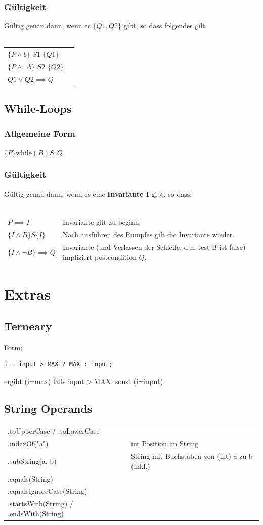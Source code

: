 \documentclass[12pt,a4paper]{article}
\begin{document}
\subsubsection{Gültigkeit}
Gültig genau dann, wenn es $\{Q1, Q2\}$ gibt, so dass folgendes gilt:\\\\
\begin{tabular}{ll}
$\{P \land b\}$ $S1$ $\{Q1\}$\\
$\{P \land \neg b \}$ $S2$ $\{Q2\}$\\
$Q1 \lor Q2 \implies Q$
\end{tabular}

\subsection{While-Loops}
\subsubsection{Allgemeine Form}
$\{P\} \text{while}(B) S; {Q}$
\subsubsection{Gültigkeit}
Gültig genau dann, wenn es eine \textbf{Invariante I} gibt, so dass:\\\\
\begin{tabularx}{\linewidth}{lX}
$P \implies I$ & Invariante gilt zu beginn.\\
$\{I \land B\} S \{I\}$ & Nach ausführen des Rumpfes gilt die Invariante wieder.\\
$\{I \land \neg B\} \implies Q$ & Invariante (und Verlassen der Schleife, d.h. test B ist false) impliziert postcondition $Q$.
\end{tabularx}
\section{Extras}
\subsection{Terneary}
Form:\\
\begin{verbatim}
i = input > MAX ? MAX : input;
\end{verbatim}
ergibt (i=max) falls input$>$MAX, sonst (i=input).
\subsection{String Operands}
\begin{tabularx}{\linewidth}{l X}
.toUpperCase / .toLowerCase\\
.indexOf("a") & int Position im String\\
.subString(a, b) & String mit Buchstaben von (int) a zu b (inkl.)\\
.equals(String)\\
.equalsIgnoreCase(String)\\
.startsWith(String) / .endsWith(String)
\end{tabularx}
\end{document}
